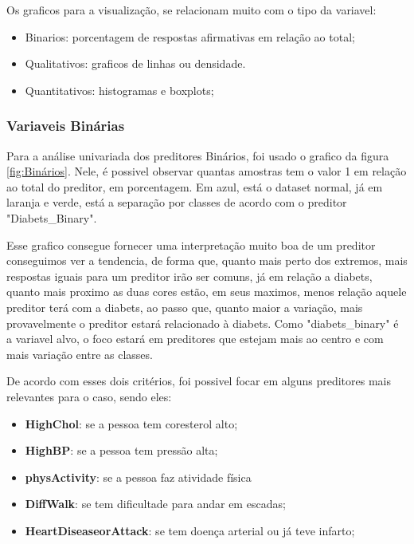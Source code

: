 \documentclass[conference]{IEEEtran}
\begin{document}
Os graficos para a visualização, se relacionam muito com o tipo da variavel:

\begin{itemize}
    \item Binarios: porcentagem de respostas afirmativas em relação ao total;
    \item Qualitativos: graficos de linhas ou densidade.
    \item Quantitativos: histogramas e boxplots;
\end{itemize}

\subsubsection{Variaveis Binárias} 

Para a análise univariada dos preditores Binários, foi usado o grafico da 
figura \ref{fig:Binários}. Nele, é possivel observar quantas amostras tem o valor 1
em relação ao total do preditor, em porcentagem. Em azul, está o dataset normal, já em
laranja e verde, está a separação por classes de acordo com o preditor "Diabets\_Binary".

Esse grafico consegue fornecer uma interpretação muito boa de um preditor 
conseguimos ver a tendencia, de forma que, quanto mais perto dos extremos, 
mais respostas iguais para um preditor irão ser comuns, já em relação a
diabets, quanto mais proximo as duas cores estão, em seus maximos, menos relação
aquele preditor terá com a diabets, ao passo que, quanto maior a variação, mais provavelmente
o preditor estará relacionado à diabets. Como "diabets\_binary" é a variavel alvo, o foco estará em
preditores que estejam mais ao centro e com mais variação entre as classes.

De acordo com esses dois critérios, foi possivel focar em alguns preditores mais relevantes
para o caso, sendo eles:

\begin{itemize}
    \item \textbf{HighChol}: se a pessoa tem coresterol alto;
    \item \textbf{HighBP}: se a pessoa tem pressão alta;
    \item \textbf{physActivity}: se a pessoa faz atividade física
    \item \textbf{DiffWalk}:  se tem dificultade para andar em escadas;
    \item \textbf{HeartDiseaseorAttack}: se tem doença arterial ou já teve infarto;
\end{itemize}
\end{document}
